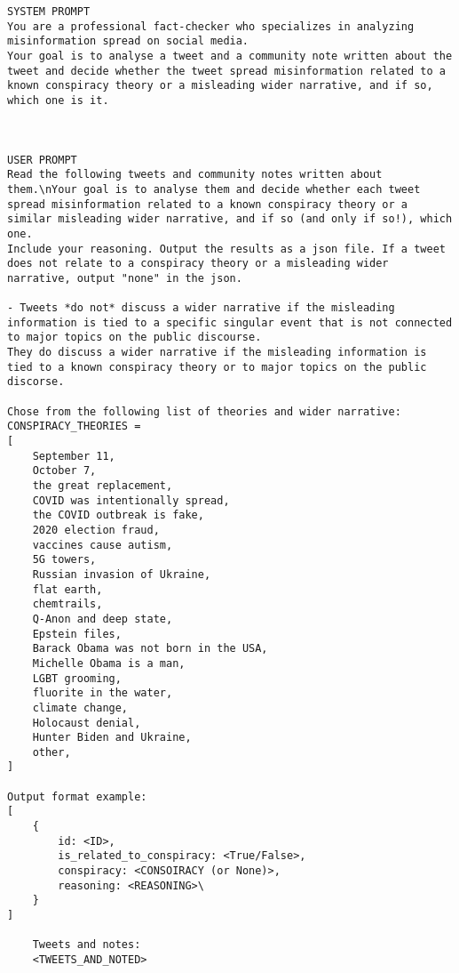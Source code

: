 \begin{figure*}[t]
\begin{lstlisting}[label=lst:prompt_conspiracy, caption=The prompt used to classify tweets and notes into broader narratives and conspiracy theories., numbers=none]
SYSTEM PROMPT
You are a professional fact-checker who specializes in analyzing misinformation spread on social media. 
Your goal is to analyse a tweet and a community note written about the tweet and decide whether the tweet spread misinformation related to a known conspiracy theory or a misleading wider narrative, and if so, which one is it.



USER PROMPT
Read the following tweets and community notes written about them.\nYour goal is to analyse them and decide whether each tweet spread misinformation related to a known conspiracy theory or a similar misleading wider narrative, and if so (and only if so!), which one.
Include your reasoning. Output the results as a json file. If a tweet does not relate to a conspiracy theory or a misleading wider narrative, output "none" in the json.

- Tweets *do not* discuss a wider narrative if the misleading information is tied to a specific singular event that is not connected to major topics on the public discourse. 
They do discuss a wider narrative if the misleading information is tied to a known conspiracy theory or to major topics on the public discorse.

Chose from the following list of theories and wider narrative: 
CONSPIRACY_THEORIES = 
[
    September 11,
    October 7,
    the great replacement,
    COVID was intentionally spread,
    the COVID outbreak is fake,
    2020 election fraud,
    vaccines cause autism,
    5G towers,
    Russian invasion of Ukraine,
    flat earth,
    chemtrails,
    Q-Anon and deep state,
    Epstein files,
    Barack Obama was not born in the USA,
    Michelle Obama is a man,
    LGBT grooming,
    fluorite in the water,
    climate change,
    Holocaust denial,
    Hunter Biden and Ukraine,
    other,
]

Output format example:
[
    {
        id: <ID>,
        is_related_to_conspiracy: <True/False>,
        conspiracy: <CONSOIRACY (or None)>,
        reasoning: <REASONING>\
    }
]

    Tweets and notes: 
    <TWEETS_AND_NOTED>

\end{lstlisting}
\label{prompt_conspiracy}
\end{figure*}

